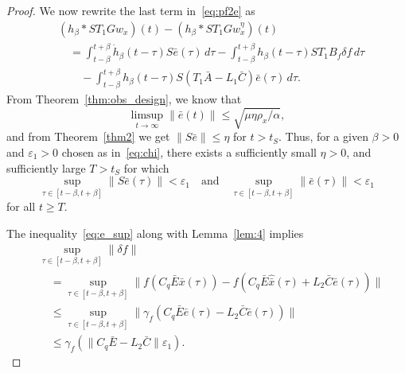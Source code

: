 \documentclass[times, doublespace]{rncauth}
\newcommand{\hb}[1]{\hat{\bar{#1}}}
\newcommand{\intinfb}{\int_{t-\beta}^{t+\beta}}
\begin{document}
\begin{proof}
	We now rewrite the last term in~\eqref{eq:pf2e} as
	\begin{align}
	\nonumber& (h_\beta\ast ST_1 Gw_x)(t)-(h_\beta\ast ST_1 G\hat w^\eta_x)(t) \\
	\nonumber& \quad =\intinfb \dot h_\beta(t-\tau)S\bar e(\tau)\, d\tau - \intinfb h_\beta(t-\tau)S T_1 B_f\delta f\,d\tau\\
	&\quad\quad - \intinfb h_\beta(t-\tau) S(T_1 \bar A -L_1\bar C)\bar e(\tau)\,d\tau.\label{eq:pf2f}
	\end{align}
From Theorem~\ref{thm:obs_design}, we know that 
	$$
	\limsup_{t\to \infty}\|\bar e(t)\|\le \sqrt{\mu\eta\rho_x/\alpha},
	$$ and from Theorem~\ref{thm2} we get $\|S\bar e\|\le \eta$ for $t>t_S$. Thus, for a given $\beta>0$ and $\varepsilon_1>0$ chosen as in~\eqref{eq:chi}, there exists a sufficiently small $\eta>0$, and sufficiently large $T>t_S$ for which
	\begin{equation}\label{eq:e_sup}
	\sup_{\tau\in[t-\beta, t+\beta]}\|S\bar e(\tau)\| < \varepsilon_1
	\quad \text{and} \quad
	\sup_{\tau\in[t-\beta, t+\beta]}\|\bar e(\tau)\| < \varepsilon_1
	\end{equation}
	for all $t\ge T$. 
	
	The inequality~\eqref{eq:e_sup} along with Lemma~\ref{lem:4} implies
	\begin{align*}
	&\sup_{\tau\in[t-\beta, t+\beta]}\|\delta f\| \\
	&\quad= \sup_{\tau\in[t-\beta, t+\beta]}\|f(C_q\bar E\bar x(\tau))-f(C_q\bar E\hb x(\tau)+L_2\bar C\bar e(\tau))\| \\
	&\quad \le \sup_{\tau\in[t-\beta, t+\beta]}\|\gamma_f\left(C_q\bar E\bar e(\tau)-L_2\bar C\bar e(\tau)\right)\|\\
	&\quad\le \gamma_f\left(\|C_q\bar E-L_2\bar C\|\varepsilon_1\right).
	\end{align*}
	

\end{proof}
\end{document}
